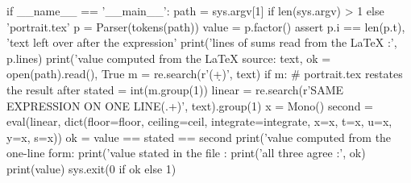 if __name__ == '__main__':
    path = sys.argv[1] if len(sys.argv) > 1 else 'portrait.tex'
    p = Parser(tokens(path))
    value = p.factor()
    assert p.i == len(p.t), 'text left over after the expression'
    print('lines of sums read from the LaTeX   :', p.lines)
    print('value computed from the LaTeX source: %
    text, ok = open(path).read(), True
    m = re.search(r'\nVALUE\n(\d+)\n', text)
    if m:                                             # portrait.tex restates the result after 
        stated = int(m.group(1))
        linear = re.search(r'\nTHE SAME EXPRESSION ON ONE LINE\n(.+)\n', text).group(1)
        x = Mono()
        second = eval(linear, dict(floor=floor, ceiling=ceil, integrate=integrate, x=x, t=x, u=x, y=x, s=x))
        ok = value == stated == second
        print('value computed from the one-line form: %
        print('value stated in the file            : %
        print('all three agree                     :', ok)
    print(value)
    sys.exit(0 if ok else 1)

